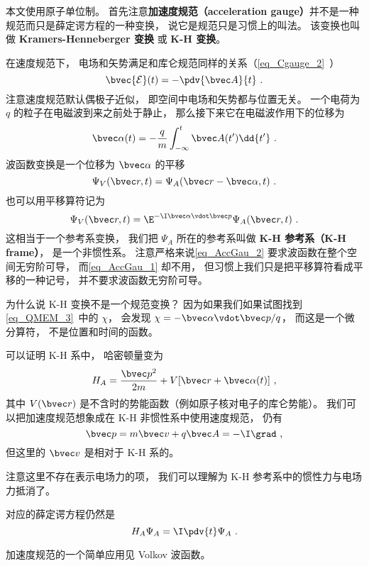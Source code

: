 

本文使用原子单位制。 首先注意\textbf{加速度规范（acceleration gauge）}并不是一种规范而只是薛定谔方程的一种变换， 说它是规范只是习惯上的叫法。 该变换也叫做 \textbf{Kramers-Henneberger 变换} 或 \textbf{K-H 变换}。

在速度规范下， 电场和矢势满足和库仑规范同样的关系（\autoref{eq_Cgauge_2}~）
\begin{equation}\label{eq_AccGau_5}
\bvec {\mathcal{E}}(t) = -\pdv{\bvec A}{t}~.
\end{equation}
注意速度规范默认偶极子近似， 即空间中电场和矢势都与位置无关。 一个电荷为 $q$ 的粒子在电磁波到来之前处于静止， 那么接下来它在电磁波作用下的位移为
\begin{equation}\label{eq_AccGau_3}
\bvec \alpha(t) = -\frac{q}{m}\int_{-\infty}^t \bvec A(t') \dd{t'}~.
\end{equation}
波函数变换是一个位移为 $\bvec \alpha$ 的平移
\begin{equation}\label{eq_AccGau_1}
\Psi_V(\bvec r, t) = \Psi_A(\bvec r - \bvec \alpha, t)~.
\end{equation}
也可以用平移算符记为
\begin{equation}\label{eq_AccGau_2}
\Psi_V(\bvec r, t) = \E^{-\I \bvec \alpha \vdot \bvec p} \Psi_A(\bvec r, t)~.
\end{equation}
这相当于一个参考系变换， 我们把 $\Psi_A$ 所在的参考系叫做 \textbf{K-H 参考系（K-H frame）}， 是一个非惯性系。 注意严格来说\autoref{eq_AccGau_2} 要求波函数在整个空间无穷阶可导， 而\autoref{eq_AccGau_1} 却不用， 但习惯上我们只是把平移算符看成平移的一种记号， 并不要求波函数无穷阶可导。

为什么说 K-H 变换不是一个规范变换？ 因为如果我们如果试图找到\autoref{eq_QMEM_3}~中的 $\chi$， 会发现 $\chi = -\bvec \alpha \vdot \bvec p/q$， 而这是一个微分算符， 不是位置和时间的函数。

可以证明 K-H 系中， 哈密顿量变为
\begin{equation}
H_A = \frac{\bvec p^2}{2m} + V[\bvec r + \bvec \alpha(t)]~,
\end{equation}
其中 $V(\bvec r)$ 是不含时的势能函数（例如原子核对电子的库仑势能）。 我们可以把加速度规范想象成在 K-H 非惯性系中使用速度规范， 仍有
\begin{equation}
\bvec p = m\bvec v + q\bvec A = -\I \grad~,
\end{equation}
但这里的 $\bvec v$ 是相对于 K-H 系的。

注意这里不存在表示电场力的项， 我们可以理解为 K-H 参考系中的惯性力与电场力抵消了。

对应的薛定谔方程仍然是
\begin{equation}\label{eq_AccGau_4}
H_A \Psi_A = \I \pdv{t} \Psi_A~.
\end{equation}


加速度规范的一个简单应用见 Volkov 波函数。
